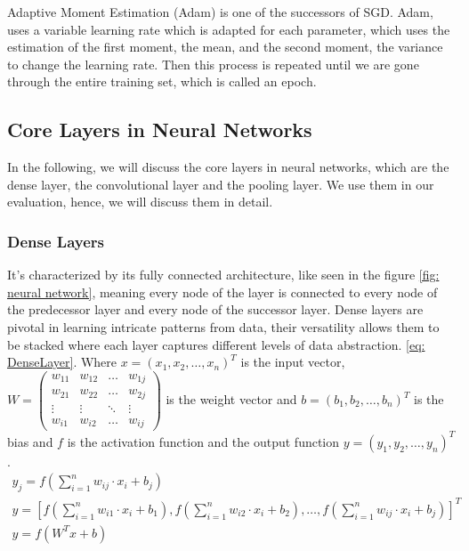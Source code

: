 Adaptive Moment Estimation (Adam)\cite{kingma_adam_2017} is one of the successors of SGD. Adam, uses a variable learning rate which is adapted for each parameter, which uses the estimation of the first moment, the mean, and the second moment, the variance to change the learning rate.
Then this process is repeated until we are gone through the entire training set, which is called an epoch.

\subsection*{Core Layers in Neural Networks}\label{subsec:core-layers-in-neural-networks}
In the following, we will discuss the core layers in neural networks, which are the dense layer, the convolutional layer and the pooling layer.
We use them in our evaluation, hence, we will discuss them in detail.
\subsubsection{Dense Layers}
It's characterized by its fully connected architecture, like seen in the figure \ref{fig: neural network}, meaning every node of the layer is connected to every node of the predecessor layer and every node of the successor layer.
Dense layers are pivotal in learning intricate patterns from data, their versatility allows them to be stacked where each layer captures different levels of data abstraction.
\ref{eq: DenseLayer}.
Where $x = (x_1,x_2,\dots,x_n)^T$ is the input vector,
$W = \left(\begin{smallmatrix}w_{11} & w_{12} & \dots & w_{1j}\\w_{21} & w_{22} & \dots & w_{2j}\\\vdots & \vdots & \ddots & \vdots\\w_{i1} & w_{i2} & \dots & w_{ij}\end{smallmatrix}\right)$
is the weight vector and $b = (b_1,b_2,\dots,b_n)^T$ is the bias and $f$ is the activation function and the output function $y = (y_1,y_2,\dots,y_n)^T$.
\begin{gather}
    y_j = f\left( \sum^n_{i=1} w_{ij}\cdot x_i + b_j\right)\\
    y = \left[ f\left( \sum^n_{i=1} w_{i1} \cdot x_i + b_1\right),f\left( \sum^n_{i=1} w_{i2} \cdot x_i + b_2\right),\dots,f\left( \sum^n_{i=1} w_{ij} \cdot x_i + b_j\right) \right]^T\\
    y = f(W^T x+b)
    \label{eq: DenseLayer}
\end{gather}

